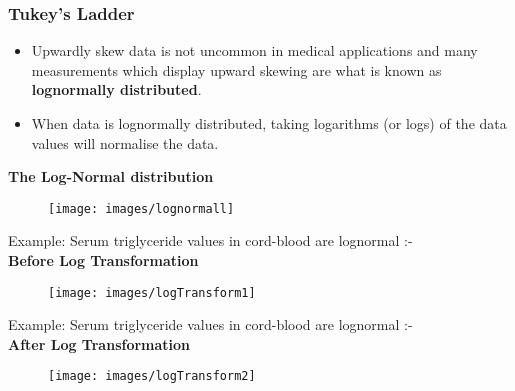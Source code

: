 \documentclass{beamer}
\begin{document}
\begin{frame}
\frametitle{Tukey's Ladder}
	\Large
\begin{itemize}
\item Upwardly skew data is not uncommon in medical applications and many measurements which display upward skewing are what is known as \textbf{lognormally distributed}. 
\item When data is lognormally distributed, taking logarithms (or logs) of the data values will normalise the data.
\end{itemize}
\end{frame}
\begin{frame}
	\textbf{The Log-Normal distribution}
	\begin{figure}
\centering
\texttt{[image: images/lognormall]}
\end{figure}

\end{frame}
\begin{frame}
Example: Serum triglyceride values in cord-blood are lognormal :-
	\\ \textbf{Before Log Transformation}\\
\begin{figure}
\centering
\texttt{[image: images/logTransform1]}

\end{figure}



\end{frame}
\begin{frame}
	Example: Serum triglyceride values in cord-blood are lognormal :-
	\\ \textbf{After Log Transformation}\\
	\begin{figure}
		\centering
		\texttt{[image: images/logTransform2]}
	\end{figure}	
	
\end{frame}
\end{document}
